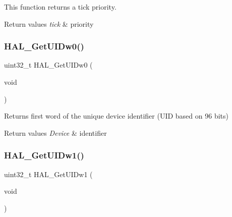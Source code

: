 This function returns a tick priority. 


\begin{DoxyRetVals}{Return values}
{\em tick} & priority \\
\hline
\end{DoxyRetVals}
\mbox{\label{group___h_a_l___exported___functions___group2_gaf982aa0a575eef3758c0840a24077506}} 
\subsubsection{\texorpdfstring{H\+A\+L\+\_\+\+Get\+U\+I\+Dw0()}{HAL\_GetUIDw0()}}
{\footnotesize\ttfamily uint32\+\_\+t H\+A\+L\+\_\+\+Get\+U\+I\+Dw0 (\begin{DoxyParamCaption}\item[{void}]{ }\end{DoxyParamCaption})}



Returns first word of the unique device identifier (U\+ID based on 96 bits) 


\begin{DoxyRetVals}{Return values}
{\em Device} & identifier \\
\hline
\end{DoxyRetVals}
\mbox{\label{group___h_a_l___exported___functions___group2_ga52720dd92ed2bd4314a2a129855d766c}} 
\subsubsection{\texorpdfstring{H\+A\+L\+\_\+\+Get\+U\+I\+Dw1()}{HAL\_GetUIDw1()}}
{\footnotesize\ttfamily uint32\+\_\+t H\+A\+L\+\_\+\+Get\+U\+I\+Dw1 (\begin{DoxyParamCaption}\item[{void}]{ }\end{DoxyParamCaption})}



